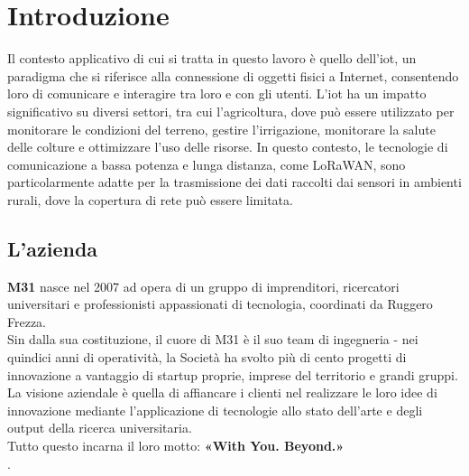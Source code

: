 \chapter{Introduzione}
\label{cap:introduzione}

Il contesto applicativo di cui si tratta in questo lavoro è quello dell'\gls{iot}, un paradigma che si riferisce alla connessione di oggetti fisici a Internet, consentendo loro di comunicare e interagire tra loro e con gli utenti.
L'\gls{iot} ha un impatto significativo su diversi settori, tra cui l'agricoltura, dove può essere utilizzato per monitorare le condizioni del terreno, gestire l'irrigazione, monitorare la salute delle colture e ottimizzare l'uso delle risorse. 
In questo contesto, le tecnologie di comunicazione a bassa potenza e lunga distanza, come LoRaWAN, sono particolarmente adatte per la trasmissione dei dati raccolti dai sensori in ambienti rurali, dove la copertura di rete può essere limitata.

\section{L'azienda}
\textbf{M31} nasce nel 2007 ad opera di un gruppo di imprenditori, ricercatori universitari e professionisti appassionati di tecnologia, coordinati da Ruggero Frezza.
\\
Sin dalla sua costituzione, il cuore di M31 è il suo team di ingegneria - nei quindici anni di operatività, la Società ha svolto più di cento progetti di innovazione a vantaggio di startup proprie, imprese del territorio e grandi gruppi.
\\
La visione aziendale è quella di affiancare i clienti nel realizzare le loro idee di innovazione mediante l'applicazione di tecnologie allo stato dell'arte e degli output della ricerca universitaria.
\\
Tutto questo incarna il loro motto: \textbf{«With You. Beyond.»}
\\ \cite{site:sito-m31}.


